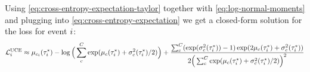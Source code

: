 Using \ref{eq:cross-entropy-expectation-taylor} together with \ref{eq:log-normal-moments} and plugging into \ref{eq:cross-entropy-expectation} we get a closed-form solution for the loss for event $i$:
\small
\begin{equation}
    \mathcal{L}_i^{\text{UCE}}
    \approx \mu_{c_i}(\tau_i^*) - \log \Big( \sum_c^C \exp(\mu_c(\tau_i^*) + \sigma_c^2(\tau_i^*) / 2) \Big) +
        \frac{\sum_c^C (\exp(\sigma_c^2(\tau_i^*)) - 1) \exp(2 \mu_c(\tau_i^*) + \sigma_c^2(\tau_i^*))}
        {2 \Big( \sum_c^C \exp(\mu_c(\tau_i^*) + \sigma_c^2(\tau_i^*) / 2) \Big)^2}
\end{equation}
\normalsize
